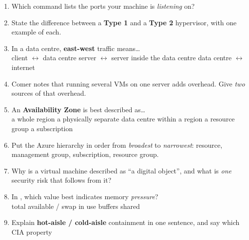 \documentclass[11pt]{article}
\begin{document}
\begin{enumerate}
\item Which command lists the ports your machine is \emph{listening} on?\\
      \cbox {} \quad \cbox {} \quad \cbox {} \quad \cbox {}
\item State the difference between a \textbf{Type 1} and a \textbf{Type 2} hypervisor, with one
      example of each.
\item In a data centre, \textbf{east-west} traffic means\dots\\
      \cbox client $\leftrightarrow$ data centre \quad
      \cbox server $\leftrightarrow$ server inside the data centre \quad
      \cbox data centre $\leftrightarrow$ internet
\item Comer notes that running several VMs on one server adds overhead. Give \emph{two} sources of
      that overhead.
\item An \textbf{Availability Zone} is best described as\dots\\
      \cbox a whole region \quad \cbox a physically separate data centre within a region \quad
      \cbox a resource group \quad \cbox a subscription
\item Put the Azure hierarchy in order from \emph{broadest} to \emph{narrowest}: resource, management
      group, subscription, resource group.
\item Why is a virtual machine described as ``a digital object'', and what is \emph{one} security risk
      that follows from it?
\item In , which value best indicates memory \emph{pressure}?\\
      \cbox total \quad \cbox available / swap in use \quad \cbox buffers \quad \cbox shared
\item Explain \textbf{hot-aisle / cold-aisle} containment in one sentence, and say which CIA property

\end{enumerate}
\end{document}
